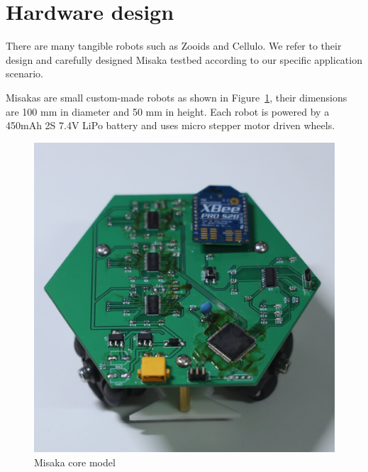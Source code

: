\documentclass[conference]{IEEEtran}
\begin{document}
















\section{Hardware design}

There are many tangible robots such as Zooids\cite{le2016zooids} and Cellulo\cite{ozgur2017cellulo}. We refer to their design and carefully designed Misaka testbed according to our specific application scenario.


Misakas are small custom-made robots as shown in Figure~\ref{fig:model}, their dimensions are 100 mm in diameter and 50 mm in height. Each robot is powered by a 450mAh 2S 7.4V LiPo battery and uses micro stepper motor driven wheels.

\begin{figure}[htbp]
    \centering
    \includegraphics[width=0.6\columnwidth]{model.jpg}
    \caption{Misaka core model}
    \label{fig:model}
\end{figure}
\end{document}
